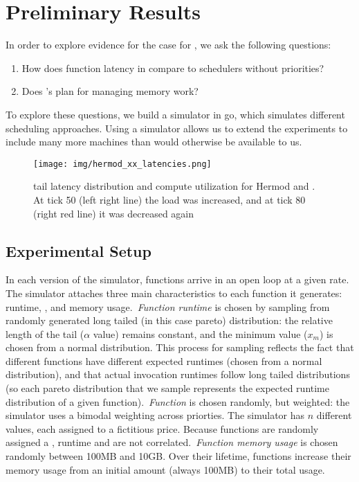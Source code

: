 \section{Preliminary Results}



In order to explore evidence for the case for \sys{}, we ask the following
questions: 
\begin{enumerate}
    \item How does function latency in \sys{} compare to schedulers without
    priorities?
    \item Does \sys{}'s plan for managing memory work?
\end{enumerate}


To explore these questions, we build a simulator in go\cite{golang}, which
simulates different scheduling approaches. Using a simulator allows us to extend
the experiments to include many more machines than would otherwise be available
to us.

\begin{figure}[t!]
    \centering
      \texttt{[image: img/hermod\_xx\_latencies.png]}
      \caption{ tail latency distribution and compute utilization for Hermod and
      \sys{}. At tick 50 (left right line) the load was increased, and at tick
      80 (right red line) it was decreased again }
    \label{fig:hermod-xx-edf}
\end{figure}


\subsection{Experimental Setup}

In each version of the simulator, functions arrive in an open loop at a given
rate. The simulator attaches three main characteristics to each function it
generates: runtime, \priceclass{}, and memory usage.\ \textit{Function runtime}
is chosen by sampling from randomly generated long tailed (in this case pareto)
distribution: the relative length of the tail ($\alpha$ value) remains constant,
and the minimum value ($x_m$) is chosen from a normal distribution. This process
for sampling reflects the fact that different functions have different expected
runtimes (chosen from a normal distribution), and that actual invocation
runtimes follow long tailed distributions (so each pareto distribution that we
sample represents the expected runtime distribution of a given function).\
\textit{Function \class{}} is chosen randomly, but weighted: the simulator uses
a bimodal weighting across priorties. The simulator has $n$ different
\priceclass{} values, each assigned to a fictitious price. Because functions are
randomly assigned a \class{}, runtime and \class{} are not correlated.\
\textit{Function memory usage} is chosen randomly between 100MB and 10GB. Over
their lifetime, functions increase their memory usage from an initial amount
(always 100MB) to their total usage.

